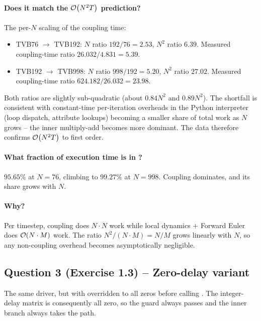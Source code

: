 \documentclass[11pt, a4paper]{article}
\begin{document}
\paragraph{Does it match the $\mathcal{O}\!\left(N^2 T\right)$ prediction?}
The per-$N$ scaling of the coupling time:
\begin{itemize}
\itemsep0em
\item TVB76 $\to$ TVB192: $N$ ratio $192/76 = 2.53$, $N^2$ ratio $6.39$.
      Measured coupling-time ratio $26.032 / 4.831 = 5.39$.
\item TVB192 $\to$ TVB998: $N$ ratio $998/192 = 5.20$, $N^2$ ratio $27.02$.
      Measured coupling-time ratio $624.182 / 26.032 = 23.98$.
\end{itemize}
Both ratios are slightly sub-quadratic (about $0.84 N^2$ and $0.89 N^2$).
The shortfall is consistent with constant-time per-iteration overheads in
the Python interpreter (loop dispatch, attribute lookups) becoming a
smaller share of total work as $N$ grows -- the inner multiply-add
becomes more dominant. The data therefore confirms $\mathcal{O}\!\left(N^2 T\right)$ to
first order.

\paragraph{What fraction of execution time is in ?}
$95.65\%$ at $N=76$, climbing to $99.27\%$ at $N=998$. Coupling
dominates, and its share grows with $N$.

\paragraph{Why?}
Per timestep, coupling does $N \cdot N$ work while local dynamics +
Forward Euler does $\mathcal{O}\!\left(N \cdot M\right)$ work. The ratio
$N^2 / (N \cdot M) = N / M$ grows linearly with $N$, so any
non-coupling overhead becomes asymptotically negligible.

\subsection{Question 3 (Exercise 1.3) -- Zero-delay variant}

The same driver, but with  overridden to all zeros before
calling . The integer-delay matrix  is
consequently all zero, so the guard  always
passes and the inner branch always takes the
 path.
\end{document}
